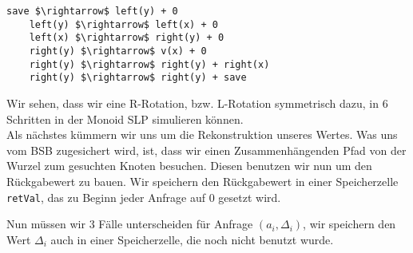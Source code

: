 \documentclass[11pt,a4paper,ngerman]{article}
\begin{document}
\begin{lstlisting}[frame=single]
	save $\rightarrow$ left(y) + 0
	left(y) $\rightarrow$ left(x) + 0
	left(x) $\rightarrow$ right(y) + 0
	right(y) $\rightarrow$ v(x) + 0
	right(y) $\rightarrow$ right(y) + right(x)
	right(y) $\rightarrow$ right(y) + save
\end{lstlisting}

Wir sehen, dass wir eine R-Rotation, bzw. L-Rotation symmetrisch dazu, in $6$ Schritten in der Monoid SLP simulieren können.\\

Als nächstes kümmern wir uns um die Rekonstruktion unseres Wertes. Was uns vom BSB zugesichert wird, ist, dass wir einen Zusammenhängenden Pfad von der Wurzel zum gesuchten Knoten besuchen. Diesen benutzen wir nun um den Rückgabewert zu bauen. Wir speichern den Rückgabewert
in einer Speicherzelle \lstinline|retVal|, das zu Beginn jeder Anfrage auf $0$ gesetzt wird.

Nun müssen wir 3 Fälle unterscheiden für Anfrage $(a_i, \Delta_i)$, wir speichern den Wert $\Delta_i$ auch in einer Speicherzelle, die noch nicht benutzt wurde.
\end{document}
